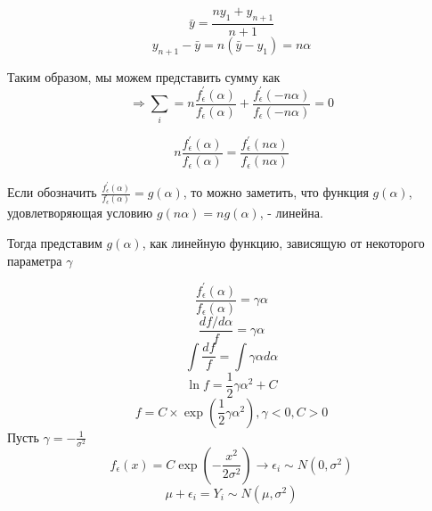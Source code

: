 \documentclass[a4paper,12pt]{article}
\begin{document}
	\[ \bar{y} = \frac{ny_1 + y_{n + 1}}{n + 1}\]
	\[ y_{n+1} - \bar{y} = n(\bar{y} - y_1) = n\alpha\]
	
	Таким образом, мы можем представить сумму как
	\[ \Rightarrow \sum_i = n\frac{f_{\epsilon}^{'}(\alpha)}{f_{\epsilon}(\alpha)} + \frac{f_{\epsilon}^{'}(-n\alpha)}{f_{\epsilon}(-n\alpha)} = 0\] 
	
	\[ n\frac{f_{\epsilon}^{'}(\alpha)}{f_{\epsilon}(\alpha)} =  \frac{f_{\epsilon}^{'}(n\alpha)}{f_{\epsilon}(n\alpha)} \]
	
	Если обозначить $\frac{f_{\epsilon}^{'}(\alpha)}{f_{\epsilon}(\alpha)} = g(\alpha)$, то можно заметить, что функция $g(\alpha)$, удовлетворяющая условию $g(n\alpha) = ng(\alpha)$, - линейна. 
	
	Тогда представим $g(\alpha)$, как линейную функцию, зависящую от некоторого параметра $\gamma$
	
	\[  \frac{f_{\epsilon}^{'}(\alpha)}{f_{\epsilon}(\alpha)} =  \gamma \alpha\]
	\[ \frac{d f/ d \alpha}{f} = \gamma \alpha\]
	\[ \int \frac{d f}{f} = \int \gamma \alpha d \alpha\] 
	\[ \ln f = \frac{1}{2} \gamma \alpha^2 + C\] 
	\[ f = C \times \exp{(\dfrac{1}{2}\gamma \alpha^2)}, \gamma < 0, C > 0\]
	Пусть $\gamma = - \frac{1}{\sigma^2}$
	\[ f_\epsilon(x) = C \exp{(-\frac{x^2}{2\sigma^2})} \rightarrow \epsilon_i \sim N(0, \sigma^2)\]
	\[ \mu + \epsilon_i = Y_i \sim N(\mu, \sigma^2)\]
	
\end{document}

